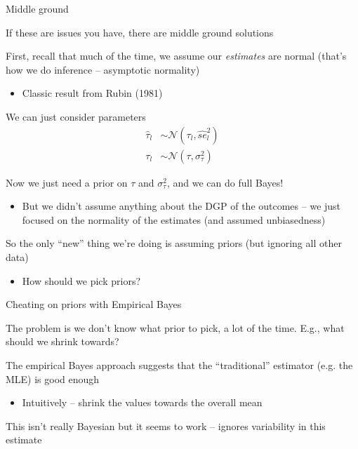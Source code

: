 \documentclass[notes,11pt, aspectratio=169]{beamer}
\newenvironment{wideitemize}{\itemize\addtolength{\itemsep}{10pt}}{\enditemize}
\begin{document}
\begin{frame}{Middle ground}
  \begin{wideitemize}
  \item If these are issues you have, there are middle ground solutions
  \item First, recall that much of the time, we assume our
    \emph{estimates} are normal (that's how we do inference --
    asymptotic normality)
    \begin{itemize}
    \item Classic result from Rubin (1981)
    \end{itemize}
  \item We can just consider parameters
    \begin{align*}
      \hat{\tau}_{l} &\sim \mathcal{N}(\tau_{l}, \hat{se}_{l}^{2})\\
      \tau_{l} &\sim \mathcal{N}(\tau, \sigma_{\tau}^{2})
    \end{align*}
  \item Now we just need a prior on $\tau$ and $\sigma_{\tau}^{2}$,
    and we can do full Bayes!
    \begin{itemize}
    \item But we didn't assume anything about the DGP of the outcomes
      -- we just focused on the normality of the estimates (and
      assumed unbiasedness)
    \end{itemize}
  \item So the only ``new'' thing we're doing is assuming priors (but
    ignoring all other data)
    \begin{itemize}
    \item How should we pick priors?
    \end{itemize}
  \end{wideitemize}
\end{frame}

\begin{frame}{Cheating on priors with Empirical Bayes}
  \begin{wideitemize}
  \item The problem is we don't know what prior to pick, a lot of the
    time. E.g., what should we shrink towards?
  \item The empirical Bayes approach suggests that the ``traditional'' estimator (e.g. the MLE) is good enough
    \begin{itemize}
    \item Intuitively -- shrink the values towards the overall mean
    \end{itemize}
  \item   This isn't really Bayesian but it seems to work -- ignores
  variability in this estimate
  \end{wideitemize}
\end{frame}
\end{document}
